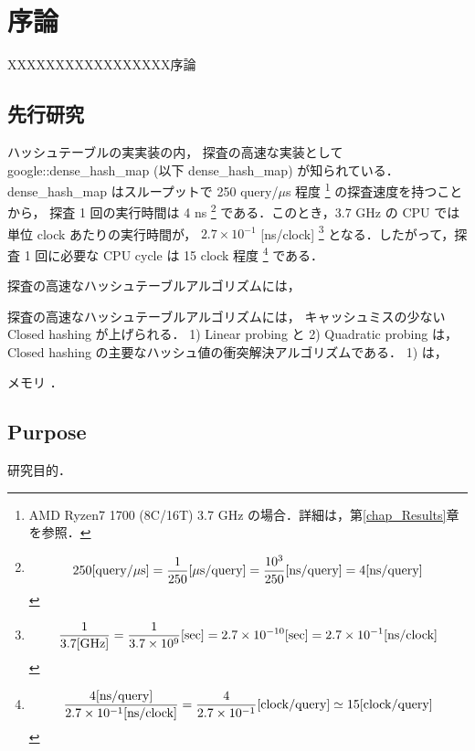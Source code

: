 \chapter{序論}
\label{chap_Introduction}

XXXXXXXXXXXXXXXXX序論

\section{先行研究}
ハッシュテーブルの実実装の内，
探査の高速な実装として google::dense\_hash\_map (以下 dense\_hash\_map) が知られている．
dense\_hash\_map はスループットで 250 query/$\mu$s 程度
\footnote{AMD Ryzen7 1700 (8C/16T) 3.7 GHz の場合．詳細は，第\ref{chap_Results}章を参照．}
の探査速度を持つことから，
探査 1 回の実行時間は 4 ns
\footnote{
  \begin{align*}
    250{\rm [query \slash \mu s]}
    = \frac{1}{250} {\rm [\mu s \slash query]}
    = \frac{10^3}{250} {\rm [ns \slash query]}
    = 4 {\rm [ns \slash query]}
  \end{align*}
}
である．このとき，3.7 GHz の CPU では単位 clock あたりの実行時間が，
$2.7 \times 10^{-1}$ [ns/clock]
\footnote{
  \begin{align*}
    \frac{1}{3.7 {\rm [GHz]}}
    = \frac{1}{3.7 \times 10^9}{\rm [sec]}
    = 2.7 \times 10^{-10}{\rm [sec]}
    = 2.7 \times 10^{-1}{\rm [ns/clock]}
  \end{align*}
}
となる．したがって，探査 1 回に必要な CPU cycle は
15 clock 程度
\footnote{
  \begin{align*}
    \frac{ 4 {\rm [ns/query]} }{ 2.7 \times 10^{-1} {\rm [ns/clock]} }
    = \frac{ 4 }{ 2.7 \times 10^{-1} } {\rm [clock/query]}
    \simeq 15 {\rm [clock/query]}
  \end{align*}
}
である．




探査の高速なハッシュテーブルアルゴリズムには，



探査の高速なハッシュテーブルアルゴリズムには，
キャッシュミスの少ない Closed hashing が上げられる．
1) Linear probing と 2) Quadratic probing は，
Closed hashing の主要なハッシュ値の衝突解決アルゴリズムである．
1) は，

メモリ
．




\section{Purpose}
研究目的．

